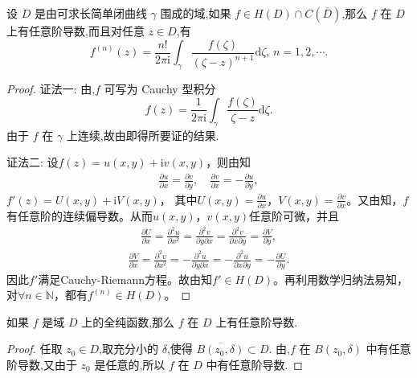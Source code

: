 \documentclass[../../main.tex]{subfiles}
\begin{document}
\begin{theorem}\label{theorem:定理3.4.3}
设 \( D \) 是由可求长简单闭曲线 \( \gamma \) 围成的域,如果 \( f \in H(D) \cap C(\overline{D}) \),那么 \( f \) 在 \( D \) 上有任意阶导数,而且对任意 \( z \in D \),有
\[
f^{(n)}(z) = \frac{n!}{2\pi \mathrm{i}} \int_{\gamma} \frac{f(\zeta)}{(\zeta - z)^{n + 1}} \mathrm{d}\zeta, \, n = 1, 2, \cdots.
\]
\end{theorem}
\begin{proof}
{\color{blue}证法一:}
由,\( f \) 可写为 Cauchy 型积分
\[
f(z) = \frac{1}{2\pi \mathrm{i}} \int_{\gamma} \frac{f(\zeta)}{\zeta - z} \mathrm{d}\zeta.
\]
由于 \( f \) 在 \( \gamma \) 上连续,故由即得所要证的结果. 

{\color{blue}证法二:}
设\( f(z) = u(x,y) + \mathrm{i}v(x,y) \)，则由知
\begin{align*}
\frac{\partial u}{\partial x} = \frac{\partial v}{\partial y},\quad \frac{\partial v}{\partial x} = -\frac{\partial u}{\partial y},
\end{align*}
\( f'(z) = U(x,y) + \mathrm{i}V(x,y) \)，
其中\( U(x,y) = \frac{\partial u}{\partial x} \)，\( V(x,y) = \frac{\partial v}{\partial x} \)。又由知，\( f \)有任意阶的连续偏导数。从而\( u(x,y) \)，\( v(x,y) \)任意阶可微，并且
\begin{align*}
\frac{\partial U}{\partial x} = \frac{\partial^2 u}{\partial x^2} = \frac{\partial^2 v}{\partial y \partial x} = \frac{\partial^2 v}{\partial x \partial y} = \frac{\partial V}{\partial y},
\end{align*}
\begin{align*}
\frac{\partial V}{\partial x} = \frac{\partial^2 v}{\partial x^2} = -\frac{\partial^2 u}{\partial y \partial x} = -\frac{\partial^2 u}{\partial x \partial y} = -\frac{\partial U}{\partial y}.
\end{align*}
因此\( f' \)满足Cauchy-Riemann方程。故由知\( f' \in H(D) \)。再利用数学归纳法易知，对\( \forall n \in \mathbb{N} \)，都有\( f^{(n)} \in H(D) \)。
\end{proof}

\begin{theorem}\label{theorem:定理3.4.4}
如果 \( f \) 是域 \( D \) 上的全纯函数,那么 \( f \) 在 \( D \) 上有任意阶导数.
\end{theorem}
\begin{proof}
任取 \( z_0 \in D \),取充分小的 \( \delta \),使得 \( \overline{B(z_0, \delta)} \subset D \). 由,\( f \) 在 \( B(z_0, \delta) \) 中有任意阶导数,又由于 \( z_0 \) 是任意的,所以 \( f \) 在 \( D \) 中有任意阶导数.
\end{proof}
\end{document}
